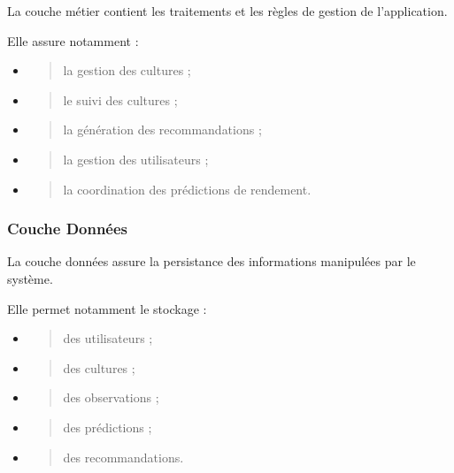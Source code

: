 La couche métier contient les traitements et les règles de gestion de
l'application.

Elle assure notamment :

\begin{itemize}
\item
  \begin{quote}
  la gestion des cultures ;
  \end{quote}
\item
  \begin{quote}
  le suivi des cultures ;
  \end{quote}
\item
  \begin{quote}
  la génération des recommandations ;
  \end{quote}
\item
  \begin{quote}
  la gestion des utilisateurs ;
  \end{quote}
\item
  \begin{quote}
  la coordination des prédictions de rendement.
  \end{quote}
\end{itemize}

\hypertarget{couche-donnuxe9es}{%
\subsubsection{Couche Données}\label{couche-donnuxe9es}}

La couche données assure la persistance des informations manipulées par
le système.

Elle permet notamment le stockage :

\begin{itemize}
\item
  \begin{quote}
  des utilisateurs ;
  \end{quote}
\item
  \begin{quote}
  des cultures ;
  \end{quote}
\item
  \begin{quote}
  des observations ;
  \end{quote}
\item
  \begin{quote}
  des prédictions ;
  \end{quote}
\item
  \begin{quote}
  des recommandations.
  \end{quote}
\end{itemize}

